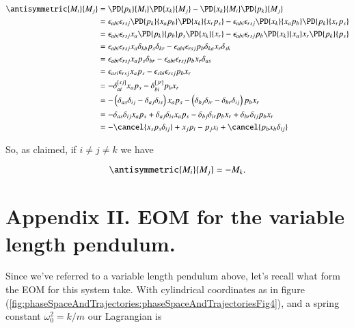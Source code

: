 \begin{align*}
\antisymmetric{M_i}{M_j} 
&=
\PD{p_k}{M_i}
\PD{x_k}{M_j}
-
\PD{x_k}{M_i}
\PD{p_k}{M_j} \\
&=
\epsilon_{a b i}
\epsilon_{r s j}
\PD{p_k}{x_a p_b}
\PD{x_k}{x_r p_s}
-
\epsilon_{a b i} 
\epsilon_{r s j}
\PD{x_k}{x_a p_b}
\PD{p_k}{x_r p_s} \\
&=
\epsilon_{a b i}
\epsilon_{r s j}
x_a \PD{p_k}{p_b}
p_s \PD{x_k}{x_r}
-
\epsilon_{a b i} 
\epsilon_{r s j}
p_b \PD{x_k}{x_a}
x_r \PD{p_k}{p_s} \\
&=
\epsilon_{a b i}
\epsilon_{r s j}
x_a \delta_{k b}
p_s \delta_{k r}
-
\epsilon_{a b i} 
\epsilon_{r s j}
p_b \delta_{k a}
x_r \delta_{s k} \\
&=
\epsilon_{a b i}
\epsilon_{r s j}
x_a 
p_s \delta_{b r}
-
\epsilon_{a b i} 
\epsilon_{r s j}
p_b 
x_r \delta_{a s} \\
&=
\epsilon_{a r i}
\epsilon_{r s j}
x_a 
p_s 
-
\epsilon_{s b i} 
\epsilon_{r s j}
p_b 
x_r \\
&=
-
\delta_{a i}^{[s j]}
x_a 
p_s 
-
\delta_{b i}^{[j r]}
p_b 
x_r \\
&=
-
\left(
\delta_{a s}\delta_{i j}
-\delta_{a j}\delta_{i s}
\right)
x_a 
p_s 
-
\left(
\delta_{b j}\delta_{i r}
-\delta_{b r}\delta_{i j}
\right)
p_b 
x_r \\
&=
-
\delta_{a s}\delta_{i j}
x_a 
p_s 
+\delta_{a j}\delta_{i s}
x_a 
p_s 
-
\delta_{b j}\delta_{i r}
p_b 
x_r 
+\delta_{b r}\delta_{i j}
p_b 
x_r 
\\
&=
-
\cancel{
x_s 
p_s 
\delta_{i j}
}
+
x_j 
p_i 
-
p_j 
x_i 
+
\cancel{
p_b 
x_b 
\delta_{i j}
}
\\
\end{align*}

So, as claimed, if $i \ne j \ne k$ we have

\begin{equation}\label{eqn:phaseSpaceAndTrajectories:410}
\antisymmetric{M_i}{M_j} = -M_k.
\end{equation}

\section{Appendix II. EOM for the variable length pendulum.}

Since we've referred to a variable length pendulum above, let's recall what form the EOM for this system take.  With cylindrical coordinates as in figure (\ref{fig:phaseSpaceAndTrajectories:phaseSpaceAndTrajectoriesFig4}), and a spring constant $\omega_0^2 = k/m$ our Lagrangian is

